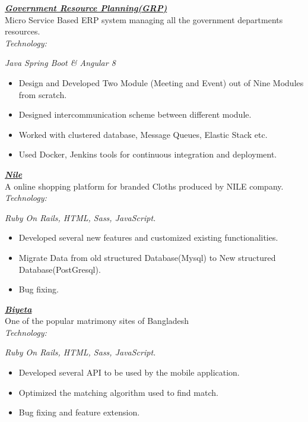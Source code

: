 \documentclass[11pt, a4paper]{awesome-cv}
\begin{document}
{{{{{{{{
{\sl \textbf{\href{https://www.grp.gov.bd/}{Government Resource Planning(GRP)} }}   \\
	Micro Service Based ERP system managing all the government departments resources. \\
{\sl Technology:} {\sl Java Spring Boot \& Angular 8
	\vspace*{-.6em}	
\begin{itemize}
	\item  Design and Developed Two Module (Meeting and Event) out of Nine Modules from scratch.
	\vspace*{-.5em}
	\item  Designed intercommunication scheme between different module.
	\vspace*{-.5em}
	\item  Worked with clustered database, Message Queues, Elastic Stack etc.
		\vspace*{-.5em}
	\item  Used Docker, Jenkins tools for continuous integration and deployment. 
			\vspace*{-.5em}
\end{itemize}

{\sl \textbf{\href{https://nile.ch/}{Nile} }}   \\
A online shopping platform for branded Cloths produced by NILE company.\\
{\sl Technology:} {\sl Ruby On Rails, HTML, Sass, JavaScript.
	\vspace*{-.6em}
	\begin{itemize}
		\item  Developed several new features and customized existing functionalities.
		\vspace*{-.5em}
		\item Migrate Data from old structured Database(Mysql) to New structured  Database(PostGresql).
		\vspace*{-.5em}
		\item  Bug fixing.
	\end{itemize}	
	
	\vspace*{-.5em}
{\sl \textbf{\href{https://biyeta.com/en}{Biyeta} }}   \\
One of the popular matrimony sites of Bangladesh \\
{\sl Technology:} {\sl Ruby On Rails, HTML, Sass, JavaScript.
		\vspace*{-.6em}
\begin{itemize}
	\item  Developed several API to be used by the mobile application.
		\vspace*{-.5em}
	\item  Optimized the matching algorithm used to find match.
		\vspace*{-.5em}
	\item  Bug fixing and feature extension.
\end{itemize}
	
}}}}}}}}}}}
\end{document}
